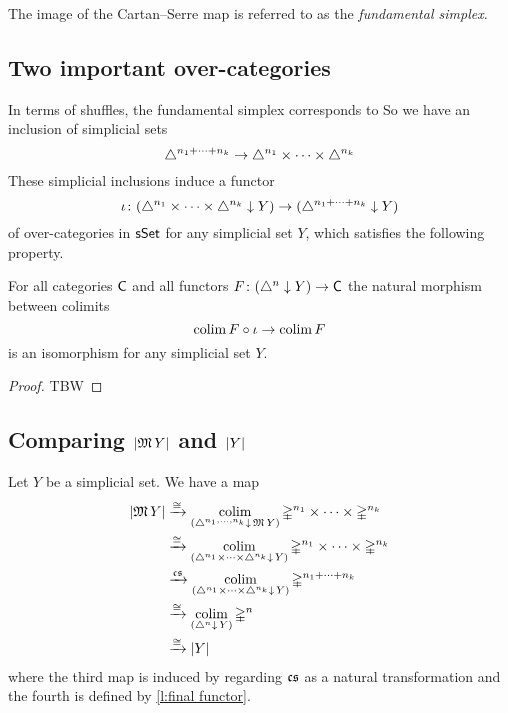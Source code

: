 
The image of the Cartan--Serre map is referred to as the \textit{fundamental simplex}. 

\subsection{Two important over-categories}


In terms of shuffles, the fundamental simplex corresponds to 
So we have an inclusion of simplicial sets
\[
\triangle^{n_1+\dots+n_k} \to \triangle^{n_1} \times \dots \times \triangle^{n_k}
\]
These simplicial inclusions induce a functor
\[
\operatorname{\iota} \colon (\triangle^{n_1} \times \dots \times \triangle^{n_k} \downarrow Y) \to (\triangle^{n_1+\dots+n_k} \downarrow Y)
\]
of over-categories in $\mathsf{sSet}$ for any simplicial set $Y$, which satisfies the following property.

\begin{lemma} \label{l:final functor}
	For all categories $\mathsf{C}$ and all functors $F \colon (\triangle^n \downarrow Y) \to \mathsf{C}$ the natural morphism between colimits
	\[
	\operatorname*{colim} F \circ \operatorname{\iota} \to \operatorname*{colim} F
	\]
	is an isomorphism for any simplicial set $Y$.
\end{lemma}

\begin{proof}
	TBW
\end{proof}

\subsection{Comparing $\lvert\operatorname{\mathfrak{M}} Y\rvert$ and $\lvert Y\rvert$}

Let $Y$ be a simplicial set.
We have a map
\[
\begin{split}
\lvert\operatorname{\mathfrak{M}} Y\rvert & \xrightarrow{\cong}
\operatorname*{colim}_{(\triangle^{n_1, \dots, n_k} \downarrow \, \operatorname{\mathfrak{M}} Y)} \mathbb{\Delta}^{n_1} \times \cdots \times \mathbb{\Delta}^{n_k} \\ & \xrightarrow{\cong}
\operatorname*{colim}_{(\triangle^{n_1} \times \dots \times \triangle^{n_k} \downarrow \, Y)} \mathbb{\Delta}^{n_1} \times \cdots \times \mathbb{\Delta}^{n_k} \\ & \xrightarrow{\operatorname{\mathfrak{cs}}}
\operatorname*{colim}_{(\triangle^{n_1} \times \dots \times \triangle^{n_k} \downarrow \, Y)} \mathbb{\Delta}^{n_1 + \dots + n_k} \\ & \xrightarrow{\cong}
\operatorname*{colim}_{(\triangle^{n} \downarrow \, Y)} \mathbb{\Delta}^{n} \\ & \xrightarrow{\cong}
\lvert Y\rvert
\end{split}
\]
where the third map is induced by regarding $\operatorname{\mathfrak{cs}}$ as a natural transformation and the fourth is defined by \cref{l:final functor}.

